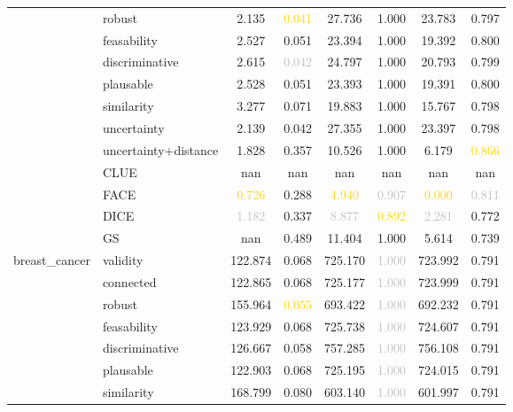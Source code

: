 \begin{table}[ht]
\begin{tabular}{l l c c c c c c}
 & robust & 2.135 & \textcolor{gold}{0.041} & 27.736 & \textcolor{bronze}{1.000} & 23.783 & 0.797 \\
 & feasability & 2.527 & 0.051 & 23.394 & \textcolor{bronze}{1.000} & 19.392 & \textcolor{bronze}{0.800} \\
 & discriminative & 2.615 & \textcolor{silver}{0.042} & 24.797 & \textcolor{bronze}{1.000} & 20.793 & 0.799 \\
 & plausable & 2.528 & 0.051 & 23.393 & \textcolor{bronze}{1.000} & 19.391 & \textcolor{bronze}{0.800} \\
 & similarity & 3.277 & 0.071 & 19.883 & \textcolor{bronze}{1.000} & 15.767 & 0.798 \\
 & uncertainty & 2.139 & \textcolor{bronze}{0.042} & 27.355 & \textcolor{bronze}{1.000} & 23.397 & 0.798 \\
 & uncertainty+distance & \textcolor{bronze}{1.828} & 0.357 & \textcolor{bronze}{10.526} & \textcolor{bronze}{1.000} & 6.179 & \textcolor{gold}{0.866} \\
 & CLUE & nan & nan & nan & nan & nan & nan \\
 & FACE & \textcolor{gold}{0.726} & 0.288 & \textcolor{gold}{4.940} & \textcolor{silver}{0.907} & \textcolor{gold}{0.000} & \textcolor{silver}{0.811} \\
 & DICE & \textcolor{silver}{1.182} & 0.337 & \textcolor{silver}{8.877} & \textcolor{gold}{0.892} & \textcolor{silver}{2.281} & 0.772 \\
 & GS & nan & 0.489 & 11.404 & \textcolor{bronze}{1.000} & \textcolor{bronze}{5.614} & 0.739 \\
\hline
\multirow{13}{*}{breast_cancer} & validity & 122.874 & 0.068 & 725.170 & \textcolor{silver}{1.000} & 723.992 & 0.791 \\
 & connected & 122.865 & 0.068 & 725.177 & \textcolor{silver}{1.000} & 723.999 & 0.791 \\
 & robust & 155.964 & \textcolor{gold}{0.055} & 693.422 & \textcolor{silver}{1.000} & 692.232 & \textcolor{bronze}{0.791} \\
 & feasability & 123.929 & 0.068 & 725.738 & \textcolor{silver}{1.000} & 724.607 & 0.791 \\
 & discriminative & 126.667 & \textcolor{bronze}{0.058} & 757.285 & \textcolor{silver}{1.000} & 756.108 & \textcolor{bronze}{0.791} \\
 & plausable & 122.903 & 0.068 & 725.195 & \textcolor{silver}{1.000} & 724.015 & 0.791 \\
 & similarity & 168.799 & 0.080 & 603.140 & \textcolor{silver}{1.000} & 601.997 & 0.791 \\

\end{tabular}
\end{table}
